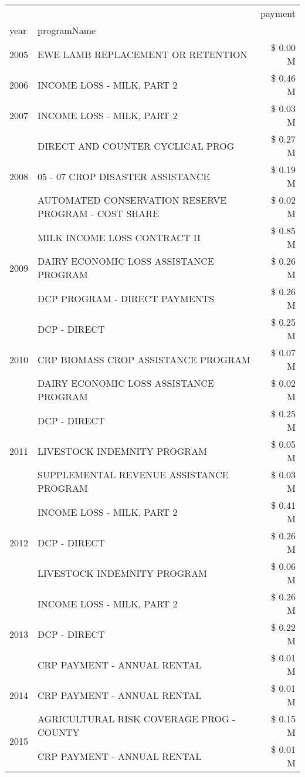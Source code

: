\begin{tabular}{llr}
\toprule
 &  & payment \\
year & programName &  \\
\midrule
2005 & EWE LAMB REPLACEMENT OR RETENTION & \$ 0.00 M \\
\cline{1-3}
2006 & INCOME LOSS - MILK, PART 2 & \$ 0.46 M \\
\cline{1-3}
2007 & INCOME LOSS - MILK, PART 2 & \$ 0.03 M \\
\cline{1-3}
\multirow[t]{3}{*}{2008} & DIRECT AND COUNTER CYCLICAL PROG & \$ 0.27 M \\
 & 05 - 07 CROP DISASTER ASSISTANCE & \$ 0.19 M \\
 & AUTOMATED CONSERVATION RESERVE PROGRAM - COST SHARE & \$ 0.02 M \\
\cline{1-3}
\multirow[t]{3}{*}{2009} & MILK INCOME LOSS CONTRACT II & \$ 0.85 M \\
 & DAIRY ECONOMIC LOSS ASSISTANCE PROGRAM & \$ 0.26 M \\
 & DCP PROGRAM - DIRECT PAYMENTS & \$ 0.26 M \\
\cline{1-3}
\multirow[t]{3}{*}{2010} & DCP - DIRECT & \$ 0.25 M \\
 & CRP BIOMASS CROP ASSISTANCE PROGRAM & \$ 0.07 M \\
 & DAIRY ECONOMIC LOSS ASSISTANCE PROGRAM & \$ 0.02 M \\
\cline{1-3}
\multirow[t]{3}{*}{2011} & DCP - DIRECT & \$ 0.25 M \\
 & LIVESTOCK INDEMNITY PROGRAM & \$ 0.05 M \\
 & SUPPLEMENTAL REVENUE ASSISTANCE PROGRAM & \$ 0.03 M \\
\cline{1-3}
\multirow[t]{3}{*}{2012} & INCOME LOSS - MILK, PART 2 & \$ 0.41 M \\
 & DCP - DIRECT & \$ 0.26 M \\
 & LIVESTOCK INDEMNITY PROGRAM & \$ 0.06 M \\
\cline{1-3}
\multirow[t]{3}{*}{2013} & INCOME LOSS - MILK, PART 2 & \$ 0.26 M \\
 & DCP - DIRECT & \$ 0.22 M \\
 & CRP PAYMENT - ANNUAL RENTAL & \$ 0.01 M \\
\cline{1-3}
2014 & CRP PAYMENT - ANNUAL RENTAL & \$ 0.01 M \\
\cline{1-3}
\multirow[t]{3}{*}{2015} & AGRICULTURAL RISK COVERAGE PROG - COUNTY & \$ 0.15 M \\
 & CRP PAYMENT - ANNUAL RENTAL & \$ 0.01 M \\

\end{tabular}
